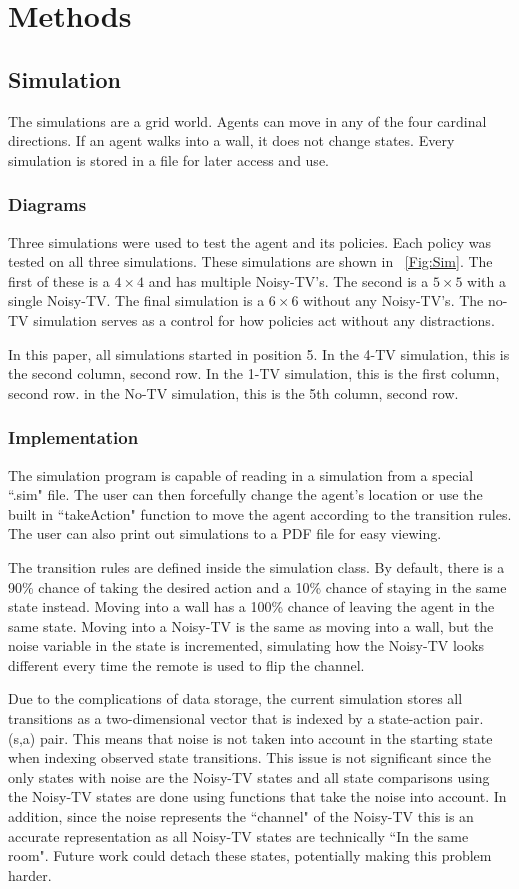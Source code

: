 \documentclass[letterpaper]{article} %
\begin{document}
\section{Methods}
\subsection{Simulation}
The simulations are a grid world. Agents can move in any of the four cardinal directions. If an agent walks into a wall, it does not change states. Every simulation is stored in a file for later access and use.
\subsubsection{Diagrams}
Three simulations were used to test the agent and its policies. Each policy was tested on all three simulations. These simulations are shown in \figurename~\ref{Fig:Sim}. The first of these is a $4\times4$ and has multiple Noisy-TV's. The second is a $5\times5$ with a single Noisy-TV. The final simulation is a $6\times6$ without any Noisy-TV's. The no-TV simulation serves as a control for how policies act without any distractions.

In this paper, all simulations started in position 5. In the 4-TV simulation, this is the second column, second row. In the 1-TV simulation, this is the first column, second row. in the No-TV simulation, this is the 5th column, second row.
\subsubsection{Implementation}
The simulation program is capable of reading in a simulation from a special ``.sim" file. The user can then forcefully change the agent's location or use the built in ``takeAction" function to move the agent according to the transition rules. The user can also print out simulations to a PDF file for easy viewing.

The transition rules are defined inside the simulation class. By default, there is a 90\% chance of taking the desired action and a 10\% chance of staying in the same state instead. Moving into a wall has a 100\% chance of leaving the agent in the same state. Moving into a Noisy-TV is the same as moving into a wall, but the noise variable in the state is incremented, simulating how the Noisy-TV looks different every time the remote is used to flip the channel.

Due to the complications of data storage, the current simulation stores all transitions as a two-dimensional vector that is indexed by a state-action pair. (s,a) pair. This means that noise is not taken into account in the starting state when indexing observed state transitions. This issue is not significant since the only states with noise are the Noisy-TV states and all state comparisons using the Noisy-TV states are done using functions that take the noise into account. In addition, since the noise represents the ``channel" of the Noisy-TV this is an accurate representation as all Noisy-TV states are technically ``In the same room". Future work could detach these states, potentially making this problem harder.
\end{document}
